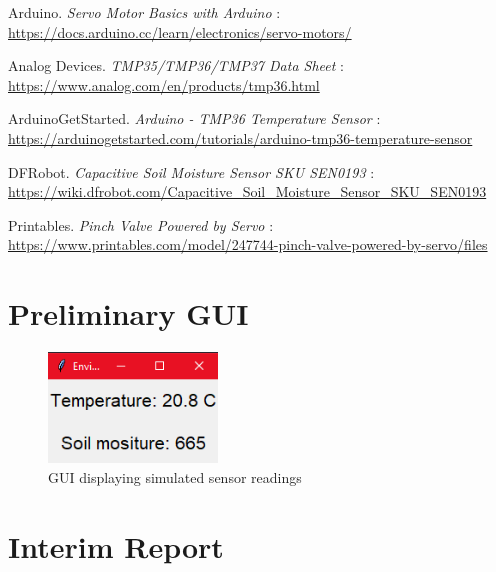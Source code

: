 \documentclass[a4paper,11pt]{article}
\begin{document}
\begin{thebibliography}{9}

Arduino. \textit{Servo Motor Basics with Arduino} : \\
\url{https://docs.arduino.cc/learn/electronics/servo-motors/}

Analog Devices. \textit{TMP35/TMP36/TMP37 Data Sheet} : \\
\url{https://www.analog.com/en/products/tmp36.html} 

ArduinoGetStarted. \textit{Arduino - TMP36 Temperature Sensor} : \\
\url{https://arduinogetstarted.com/tutorials/arduino-tmp36-temperature-sensor}

DFRobot. \textit{Capacitive Soil Moisture Sensor SKU SEN0193} : \\
\url{https://wiki.dfrobot.com/Capacitive_Soil_Moisture_Sensor_SKU_SEN0193}

Printables. \textit{Pinch Valve Powered by Servo} : \\
\url{https://www.printables.com/model/247744-pinch-valve-powered-by-servo/files}

\end{thebibliography}

\newpage
\appendix

\section{Preliminary GUI}

\begin{figure}[H]
    \centering
    \includegraphics[width=0.4\textwidth]{Dummy Readings.png}
    \caption{GUI displaying simulated sensor readings}
    \label{fig:prelim_GUI_readings}
\end{figure}

\section{Interim Report}
\end{document}
